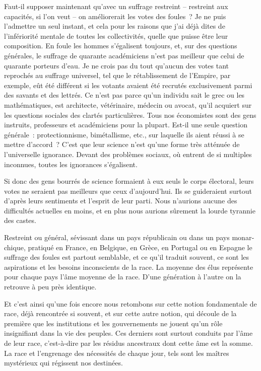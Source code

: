 \documentclass[french,twoside]{book} %
\begin{document}
Faut-il supposer maintenant qu’avec un suffrage restreint – restreint aux capacités, si l’on veut – on améliorerait les votes des foules ? Je ne puis l’admettre un seul instant, et cela pour les raisons que j’ai déjà dites de l’infériorité mentale de toutes les collectivités, quelle que puisse être leur composition. En foule les hommes s’égali­sent toujours, et, sur des questions générales, le suffrage de quarante académiciens n’est pas meilleur que celui de quarante porteurs d’eau. Je ne crois pas du tout qu’aucun des votes tant reprochés au suffrage universel, tel que le rétablissement de l’Empire, par exemple, eût été différent si les votants avaient été recrutés exclusive­ment parmi des savants et des lettrés. Ce n’est pas parce qu’un individu sait le grec ou les mathématiques, est architecte, vétérinaire, médecin ou avocat, qu’il acquiert sur les questions sociales des clartés particulières. Tous nos économistes sont des gens instruits, professeurs et académiciens pour la plupart. Est-il une seule question générale : protectionnisme, bimétallisme, etc., sur laquelle ils aient réussi à se mettre d’accord ? C’est que leur science n’est qu’une forme très atténuée de l’universelle ignorance. Devant des problèmes sociaux, où entrent de si multiples inconnues, toutes les ignorances s’égalisent.\par
Si donc des gens bourrés de science formaient à eux seuls le corps électoral, leurs votes ne seraient pas meilleurs que ceux d’aujourd’hui. Ils se guideraient surtout d’après leurs sentiments et l’esprit de leur parti. Nous n’aurions aucune des difficultés actuelles en moins, et en plus nous aurions sûrement la lourde tyrannie des castes.\par
Restreint ou général, sévissant dans un pays républicain ou dans un pays monar­chique, pratiqué en France, en Belgique, en Grèce, en Portugal ou en Espagne le suffrage des foules est partout semblable, et ce qu’il traduit souvent, ce sont les aspira­tions et les besoins inconscients de la race. La moyenne des élus représente pour chaque pays l’âme moyenne de la race. D’une génération à l’autre on la retrouve à peu près identique.\par
Et c’est ainsi qu’une fois encore nous retombons sur cette notion fondamentale de race, déjà rencontrée si souvent, et sur cette autre notion, qui découle de la première que les institutions et les gouvernements ne jouent qu’un rôle insignifiant dans la vie des peuples. Ces derniers sont surtout conduits par l’âme de leur race, c’est-à-dire par les résidus ancestraux dont cette âme est la somme. La race et l’engrenage des néces­sités de chaque jour, tels sont les maîtres mystérieux qui régissent nos destinées.
\end{document}
